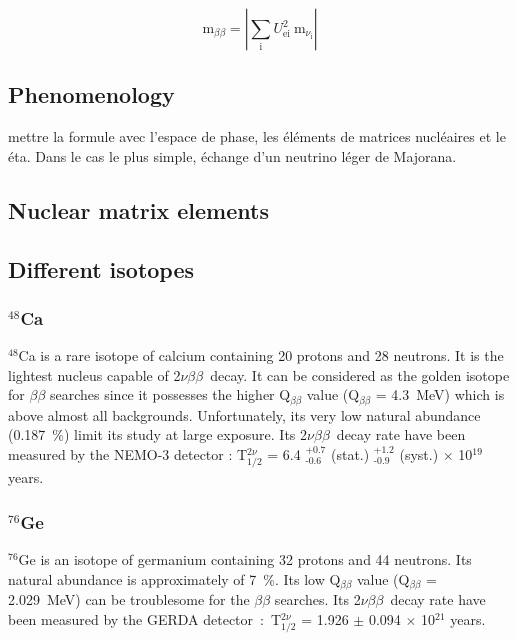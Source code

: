 \documentclass[main.tex]{subfiles}
\begin{document}
\begin{equation}
\text{m}_{\beta\beta} = |\sum_\text{i}U_{\text{ei}}^\text{2}~\text{m}_{\nu_\text{i}} |
\end{equation}






\subsection{Phenomenology}
\NI mettre la formule avec l'espace de phase, les éléments de matrices nucléaires et le éta. Dans le cas le plus simple, échange d'un neutrino léger de Majorana.



\subsection{Nuclear matrix elements}\label{sec:NME}

\subsection{Different isotopes}
\subsubsection{$^{\text{48}}$Ca}


\NI $^\text{48}$Ca is a rare isotope of calcium containing 20 protons and 28 neutrons. It is the lightest nucleus capable of 2$\nu\beta\beta$~decay. It can be considered as the golden isotope for $\beta\beta$ searches since it possesses the higher Q$_{\beta\beta}$ value (Q$_{\beta\beta}$ = 4.3~MeV) which is above almost all backgrounds. Unfortunately, its very low natural abundance (0.187~\%) limit its study at large exposure. Its 2$\nu\beta\beta$~decay rate have been measured by the NEMO-3 detector : T$_{\text{1/2}}^{\text{2}\nu}$ = 6.4 $^{\text{+0.7}}_{\text{-0.6}}$ (stat.) $^{\text{+1.2}}_{\text{-0.9}}$ (syst.) $\times$ 10$^{\text{19}}$ years. 

 
\subsubsection{$^{\text{76}}$Ge}


\NI $^\text{76}$Ge is an isotope of germanium containing 32 protons and 44 neutrons. Its natural abundance is approximately of 7~\%. Its low Q$_{\beta\beta}$ value (Q$_{\beta\beta}$ = 2.029~MeV) can be troublesome for the $\beta\beta$ searches. Its 2$\nu\beta\beta$~decay rate have been measured by the GERDA detector~:~T$_{\text{1/2}}^{\text{2}\nu}$ = 1.926 $\pm$ 0.094 $\times$ 10$^{\text{21}}$ years.   
\end{document}
